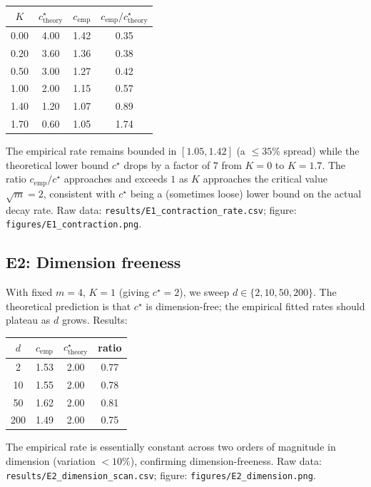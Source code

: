 \documentclass[11pt]{article}
\theoremstyle{definition}
\begin{document}
\begin{center}
\begin{tabular}{cccc}
\hline
$K$ & $c^\star_{\text{theory}}$ & $c_{\text{emp}}$ & $c_{\text{emp}}/c^\star_{\text{theory}}$ \\
\hline
0.00 & 4.00 & 1.42 & 0.35 \\
0.20 & 3.60 & 1.36 & 0.38 \\
0.50 & 3.00 & 1.27 & 0.42 \\
1.00 & 2.00 & 1.15 & 0.57 \\
1.40 & 1.20 & 1.07 & 0.89 \\
1.70 & 0.60 & 1.05 & 1.74 \\
\hline
\end{tabular}
\end{center}

The empirical rate remains bounded in $[1.05, 1.42]$ (a $\le 35\%$ spread) while the theoretical lower bound $c^\star$ drops by a factor of $7$ from $K = 0$ to $K = 1.7$. The ratio $c_{\mathrm{emp}}/c^\star$ approaches and exceeds $1$ as $K$ approaches the critical value $\sqrt m = 2$, consistent with $c^\star$ being a (sometimes loose) lower bound on the actual decay rate. Raw data: \texttt{results/E1\_contraction\_rate.csv}; figure: \texttt{figures/E1\_contraction.png}.

\subsection{E2: Dimension freeness}
With fixed $m = 4$, $K = 1$ (giving $c^\star = 2$), we sweep $d \in \{2, 10, 50, 200\}$. The theoretical prediction is that $c^\star$ is dimension-free; the empirical fitted rates should plateau as $d$ grows. Results:

\begin{center}
\begin{tabular}{cccc}
\hline
$d$ & $c_{\text{emp}}$ & $c^\star_{\text{theory}}$ & ratio \\
\hline
2   & 1.53 & 2.00 & 0.77 \\
10  & 1.55 & 2.00 & 0.78 \\
50  & 1.62 & 2.00 & 0.81 \\
200 & 1.49 & 2.00 & 0.75 \\
\hline
\end{tabular}
\end{center}

The empirical rate is essentially constant across two orders of magnitude in dimension (variation $< 10\%$), confirming dimension-freeness. Raw data: \texttt{results/E2\_dimension\_scan.csv}; figure: \texttt{figures/E2\_dimension.png}.
\end{document}

